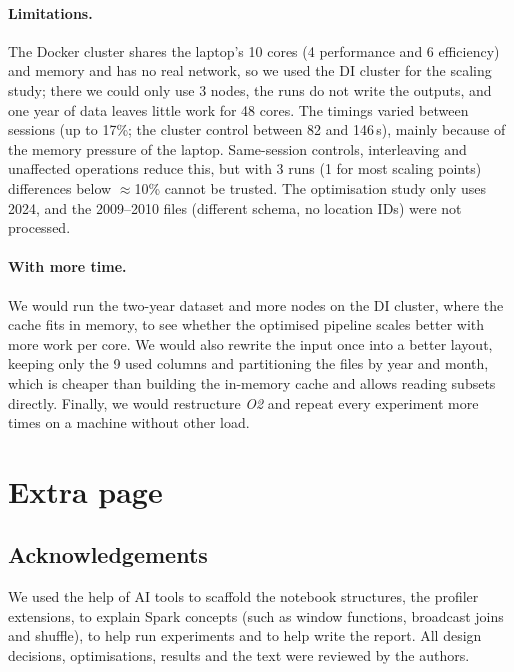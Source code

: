 \documentclass[10pt,a4paper]{article}
\begin{document}
\paragraph{Limitations.} The Docker cluster shares the laptop's 10 cores (4 performance and 6 efficiency) and memory and has no real network, so we used the DI cluster for the scaling study; there we could only use 3 nodes, the runs do not write the outputs, and one year of data leaves little work for 48 cores. The timings varied between sessions (up to 17\%; the cluster control between 82 and 146\,s), mainly because of the memory pressure of the laptop. Same-session controls, interleaving and unaffected operations reduce this, but with 3 runs (1 for most scaling points) differences below $\approx$10\% cannot be trusted. The optimisation study only uses 2024, and the 2009--2010 files (different schema, no location IDs) were not processed.

\paragraph{With more time.} We would run the two-year dataset and more nodes on the DI cluster, where the cache fits in memory, to see whether the optimised pipeline scales better with more work per core. We would also rewrite the input once into a better layout, keeping only the 9 used columns and partitioning the files by year and month, which is cheaper than building the in-memory cache and allows reading subsets directly. Finally, we would restructure \textit{O2} and repeat every experiment more times on a machine without other load.

\newpage
\section*{Extra page}

\begingroup
\renewcommand{\section}[2]{\subsection*{#2}}


\endgroup

\subsection*{Acknowledgements}
We used the help of AI tools to scaffold the notebook structures, the profiler extensions, to explain Spark concepts (such as window functions, broadcast joins and shuffle), to help run experiments and to help write the report. All design decisions, optimisations, results and the text were reviewed by the authors.
\end{document}

